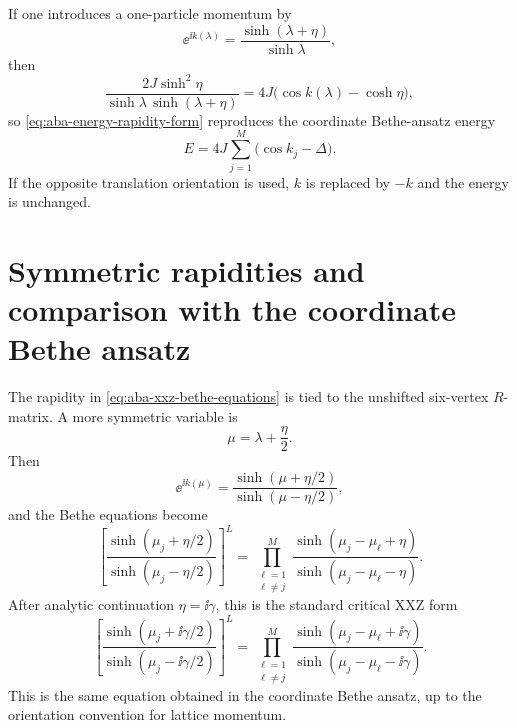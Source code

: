 If one introduces a one-particle momentum by
\begin{equation}
\label{eq:aba-momentum-rapidity-map}
    \ee^{\ii k(\lambda)}
    =
    \frac{\sinh(\lambda+\eta)}{\sinh\lambda},
\end{equation}
then
\begin{equation}
\label{eq:aba-energy-momentum-form}
    \frac{2J\sinh^2\eta}{\sinh\lambda\,\sinh(\lambda+\eta)}
    =
    4J\bigl(\cos k(\lambda)-\cosh\eta\bigr),
\end{equation}
so \cref{eq:aba-energy-rapidity-form} reproduces the coordinate Bethe-ansatz
energy
\begin{equation}
\label{eq:aba-coordinate-energy-recovered}
    E=4J\sum_{j=1}^{M}\bigl(\cos k_j-\Delta\bigr).
\end{equation}
If the opposite translation orientation is used, $k$ is replaced by $-k$ and the
energy is unchanged.

\section[Symmetric rapidities and CBA]{Symmetric rapidities and comparison with the coordinate Bethe ansatz}
\label{sec:aba-comparison-coordinate-bethe-ansatz}

The rapidity in \cref{eq:aba-xxz-bethe-equations} is tied to the unshifted
six-vertex $R$-matrix.  A more symmetric variable is
\begin{equation}
\label{eq:aba-symmetric-rapidity}
    \mu=\lambda+\frac{\eta}{2} .
\end{equation}
Then
\begin{equation}
\label{eq:aba-symmetric-momentum-map}
    \ee^{\ii k(\mu)}
    =
    \frac{\sinh(\mu+\eta/2)}{\sinh(\mu-\eta/2)},
\end{equation}
and the Bethe equations become
\begin{equation}
\label{eq:aba-symmetric-bethe-equations}
    \left[
    \frac{\sinh(\mu_j+\eta/2)}{\sinh(\mu_j-\eta/2)}
    \right]^L
    =
    \prod_{\substack{\ell=1\\ \ell\neq j}}^{M}
    \frac{\sinh(\mu_j-\mu_\ell+\eta)}
         {\sinh(\mu_j-\mu_\ell-\eta)} .
\end{equation}
After analytic continuation $\eta=\ii\gamma$, this is the standard critical XXZ
form
\begin{equation}
\label{eq:aba-critical-xxz-bethe-equations}
    \left[
    \frac{\sinh(\mu_j+\ii\gamma/2)}{\sinh(\mu_j-\ii\gamma/2)}
    \right]^L
    =
    \prod_{\substack{\ell=1\\ \ell\neq j}}^{M}
    \frac{\sinh(\mu_j-\mu_\ell+\ii\gamma)}
         {\sinh(\mu_j-\mu_\ell-\ii\gamma)} .
\end{equation}
This is the same equation obtained in the coordinate Bethe ansatz, up to the
orientation convention for lattice momentum.

